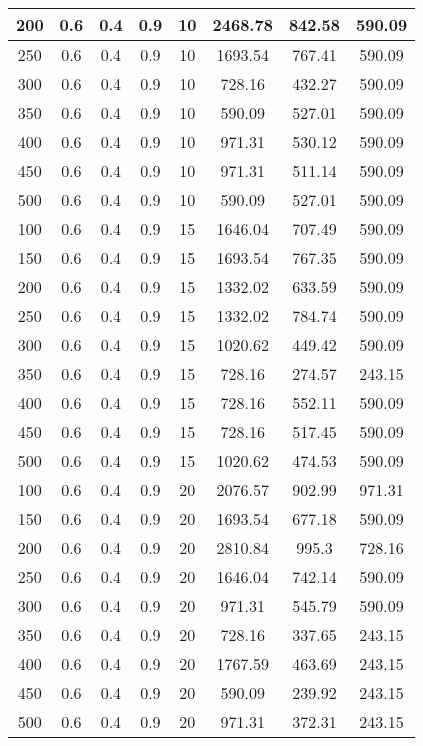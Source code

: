 \documentclass[a4paper, 12pt]{extreport}
\begin{document}
\begin{itemize}
\begin{longtable}{|c|c|c|c|c|c|c|c|}
			200 & 0.6 & 0.4 & 0.9 & 10 & 2468.78 & 842.58 & 590.09 \\\hline
			250 & 0.6 & 0.4 & 0.9 & 10 & 1693.54 & 767.41 & 590.09 \\\hline
			300 & 0.6 & 0.4 & 0.9 & 10 & 728.16 & 432.27 & 590.09 \\\hline
			350 & 0.6 & 0.4 & 0.9 & 10 & 590.09 & 527.01 & 590.09 \\\hline
			400 & 0.6 & 0.4 & 0.9 & 10 & 971.31 & 530.12 & 590.09 \\\hline
			450 & 0.6 & 0.4 & 0.9 & 10 & 971.31 & 511.14 & 590.09 \\\hline
			500 & 0.6 & 0.4 & 0.9 & 10 & 590.09 & 527.01 & 590.09 \\\hline
			100 & 0.6 & 0.4 & 0.9 & 15 & 1646.04 & 707.49 & 590.09 \\\hline
			150 & 0.6 & 0.4 & 0.9 & 15 & 1693.54 & 767.35 & 590.09 \\\hline
			200 & 0.6 & 0.4 & 0.9 & 15 & 1332.02 & 633.59 & 590.09 \\\hline
			250 & 0.6 & 0.4 & 0.9 & 15 & 1332.02 & 784.74 & 590.09 \\\hline
			300 & 0.6 & 0.4 & 0.9 & 15 & 1020.62 & 449.42 & 590.09 \\\hline
			350 & 0.6 & 0.4 & 0.9 & 15 & 728.16 & 274.57 & 243.15 \\\hline
			400 & 0.6 & 0.4 & 0.9 & 15 & 728.16 & 552.11 & 590.09 \\\hline
			450 & 0.6 & 0.4 & 0.9 & 15 & 728.16 & 517.45 & 590.09 \\\hline
			500 & 0.6 & 0.4 & 0.9 & 15 & 1020.62 & 474.53 & 590.09 \\\hline
			100 & 0.6 & 0.4 & 0.9 & 20 & 2076.57 & 902.99 & 971.31 \\\hline
			150 & 0.6 & 0.4 & 0.9 & 20 & 1693.54 & 677.18 & 590.09 \\\hline
			200 & 0.6 & 0.4 & 0.9 & 20 & 2810.84 & 995.3 & 728.16 \\\hline
			250 & 0.6 & 0.4 & 0.9 & 20 & 1646.04 & 742.14 & 590.09 \\\hline
			300 & 0.6 & 0.4 & 0.9 & 20 & 971.31 & 545.79 & 590.09 \\\hline
			350 & 0.6 & 0.4 & 0.9 & 20 & 728.16 & 337.65 & 243.15 \\\hline
			400 & 0.6 & 0.4 & 0.9 & 20 & 1767.59 & 463.69 & 243.15 \\\hline
			450 & 0.6 & 0.4 & 0.9 & 20 & 590.09 & 239.92 & 243.15 \\\hline
			500 & 0.6 & 0.4 & 0.9 & 20 & 971.31 & 372.31 & 243.15 \\\hline

\end{longtable}
\end{itemize}
\end{document}
